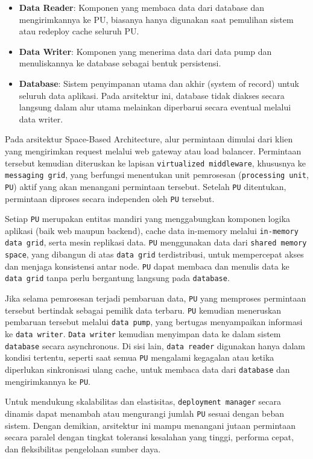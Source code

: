 \begin{itemize}
	\item \textbf{Data Reader}: Komponen yang membaca data dari database dan mengirimkannya ke PU, biasanya hanya digunakan saat pemulihan sistem atau redeploy cache seluruh PU.
	
	\item \textbf{Data Writer}: Komponen yang menerima data dari data pump dan menuliskannya ke database sebagai bentuk persistensi.
	
	\item \textbf{Database}: Sistem penyimpanan utama dan akhir (system of record) untuk seluruh data aplikasi. Pada arsitektur ini, database tidak diakses secara langsung dalam alur utama melainkan diperbarui secara eventual melalui data writer.
\end{itemize}

Pada arsitektur Space-Based Architecture, alur permintaan dimulai dari klien yang mengirimkan request melalui web gateway atau load balancer. Permintaan tersebut kemudian diteruskan ke lapisan \texttt{virtualized middleware}, khususnya ke \texttt{messaging grid}, yang berfungsi menentukan unit pemrosesan (\texttt{processing unit}, \texttt{PU}) aktif yang akan menangani permintaan tersebut. Setelah \texttt{PU} ditentukan, permintaan diproses secara independen oleh \texttt{PU} tersebut.

Setiap \texttt{PU} merupakan entitas mandiri yang menggabungkan komponen logika aplikasi (baik web maupun backend), cache data in-memory melalui \texttt{in-memory data grid}, serta mesin replikasi data. \texttt{PU} menggunakan data dari \texttt{shared memory space}, yang dibangun di atas \texttt{data grid} terdistribusi, untuk mempercepat akses dan menjaga konsistensi antar node. \texttt{PU} dapat membaca dan menulis data ke \texttt{data grid} tanpa perlu bergantung langsung pada \texttt{database}.

Jika selama pemrosesan terjadi pembaruan data, \texttt{PU} yang memproses permintaan tersebut bertindak sebagai pemilik data terbaru. \texttt{PU} kemudian meneruskan pembaruan tersebut melalui \texttt{data pump}, yang bertugas menyampaikan informasi ke \texttt{data writer}. \texttt{Data writer} kemudian menyimpan data ke dalam sistem \texttt{database} secara asynchronous. Di sisi lain, \texttt{data reader} digunakan hanya dalam kondisi tertentu, seperti saat semua \texttt{PU} mengalami kegagalan atau ketika diperlukan sinkronisasi ulang cache, untuk membaca data dari \texttt{database} dan mengirimkannya ke \texttt{PU}.

Untuk mendukung skalabilitas dan elastisitas, \texttt{deployment manager} secara dinamis dapat menambah atau mengurangi jumlah \texttt{PU} sesuai dengan beban sistem. Dengan demikian, arsitektur ini mampu menangani jutaan permintaan secara paralel dengan tingkat toleransi kesalahan yang tinggi, performa cepat, dan fleksibilitas pengelolaan sumber daya.


